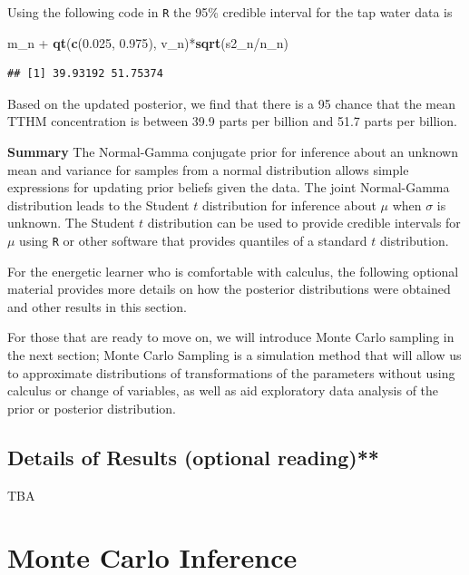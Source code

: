 \documentclass[]{book}
\newenvironment{Shaded}{\begin{snugshade}}{\end{snugshade}}
\newcommand{\KeywordTok}[1]{\textcolor[rgb]{0.13,0.29,0.53}{\textbf{{#1}}}}
\newcommand{\FloatTok}[1]{\textcolor[rgb]{0.00,0.00,0.81}{{#1}}}
\newcommand{\StringTok}[1]{\textcolor[rgb]{0.31,0.60,0.02}{{#1}}}
\newcommand{\NormalTok}[1]{{#1}}
\theoremstyle{definition}
\theoremstyle{definition}
\theoremstyle{definition}
\theoremstyle{remark}
\begin{document}
Using the following code in \texttt{R} the 95\% credible interval for
the tap water data is

\begin{Shaded}
\begin{Highlighting}[]
\NormalTok{m_n +}\StringTok{ }\KeywordTok{qt}\NormalTok{(}\KeywordTok{c}\NormalTok{(}\FloatTok{0.025}\NormalTok{, }\FloatTok{0.975}\NormalTok{), v_n)*}\KeywordTok{sqrt}\NormalTok{(s2_n/n_n)}
\end{Highlighting}
\end{Shaded}

\begin{verbatim}
## [1] 39.93192 51.75374
\end{verbatim}

Based on the updated posterior, we find that there is a 95 chance that
the mean TTHM concentration is between 39.9 parts per billion and 51.7
parts per billion.

\textbf{Summary} The Normal-Gamma conjugate prior for inference about an
unknown mean and variance for samples from a normal distribution allows
simple expressions for updating prior beliefs given the data. The joint
Normal-Gamma distribution leads to the Student \(t\) distribution for
inference about \(\mu\) when \(\sigma\) is unknown. The Student \(t\)
distribution can be used to provide credible intervals for \(\mu\) using
\texttt{R} or other software that provides quantiles of a standard \(t\)
distribution.

For the energetic learner who is comfortable with calculus, the
following optional material provides more details on how the posterior
distributions were obtained and other results in this section.

For those that are ready to move on, we will introduce Monte Carlo
sampling in the next section; Monte Carlo Sampling is a simulation
method that will allow us to approximate distributions of
transformations of the parameters without using calculus or change of
variables, as well as aid exploratory data analysis of the prior or
posterior distribution.

\subsection{Details of Results (optional
reading)**}\label{details-of-results-optional-reading}

TBA

\section{Monte Carlo Inference}\label{sec:NG-MC}
\end{document}
